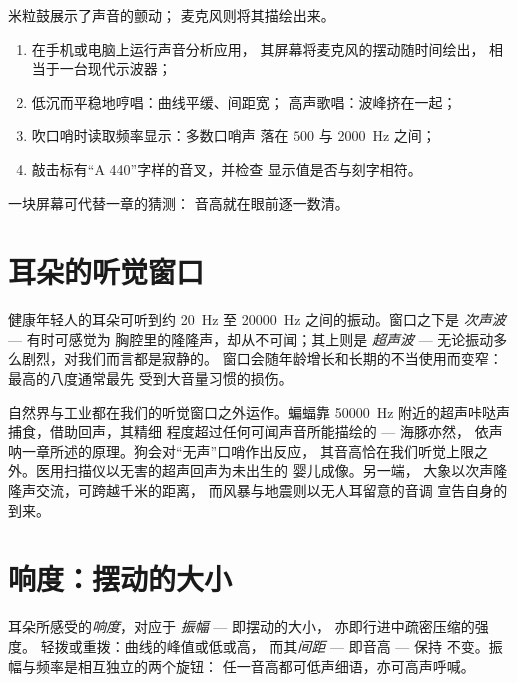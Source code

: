 \begin{method}[看见声音]\label{met:g8:sound-pitch-loudness:seeing}
米粒鼓展示了声音的颤动；
麦克风则将其描绘出来。
\begin{enumerate}
  \item 在手机或电脑上运行声音分析应用，
        其屏幕将麦克风的摆动随时间绘出，
        相当于一台现代示波器；
  \item 低沉而平稳地哼唱：曲线平缓、间距宽；
        高声歌唱：波峰挤在一起；
  \item 吹口哨时读取频率显示：多数口哨声
        落在 $500$ 与 \qty{2000}{Hz} 之间；
  \item 敲击标有“A 440”字样的音叉，并检查
        显示值是否与刻字相符。
\end{enumerate}
一块屏幕可代替一章的猜测：
音高就在眼前逐一数清。
\end{method}

\section{耳朵的听觉窗口}

\begin{proposition}[人耳的听觉范围]\label{prop:g8:sound-pitch-loudness:range}
健康年轻人的耳朵可听到约
\qty{20}{Hz} 至 \qty{20000}{Hz} 之间的振动。窗口之下是
\emph{次声波} --- 有时可感觉为
胸腔里的隆隆声，却从不可闻；其上则是
\emph{超声波} --- 无论振动多么剧烈，对我们而言都是寂静的。
窗口会随年龄增长和长期的不当使用而变窄：
最高的八度通常最先
受到大音量习惯的损伤。
\end{proposition}

\begin{example}[边界之外]\label{ex:g8:sound-pitch-loudness:beyond}
自然界与工业都在我们的听觉窗口之外运作。蝙蝠靠
\qty{50000}{Hz} 附近的超声咔哒声捕食，借助回声，其精细
程度超过任何可闻声音所能描绘的 --- 海豚亦然，
依声呐一章所述的原理。狗会对“无声”口哨作出反应，
其音高恰在我们听觉上限之外。医用扫描仪以无害的超声回声为未出生的
婴儿成像。另一端，
大象以次声隆隆声交流，可跨越千米的距离，
而风暴与地震则以无人耳留意的音调
宣告自身的到来。
\end{example}

\section{响度：摆动的大小}

\begin{proposition}[响度即振幅]\label{prop:g8:sound-pitch-loudness:loudness}
耳朵所感受的\emph{响度}，对应于
\emph{振幅} --- 即摆动的大小，
亦即行进中疏密压缩的强度。
轻拨或重拨：曲线的峰值或低或高，
而其\emph{间距} --- 即音高 --- 保持
不变。振幅与频率是相互独立的两个旋钮：
任一音高都可低声细语，亦可高声呼喊。
\end{proposition}

